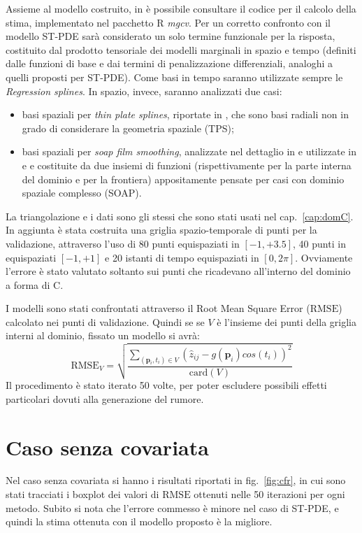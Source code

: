 \documentclass[a4paper,11pt,twoside,openright]{book}							%
\begin{document}
Assieme al modello costruito, in \cite{art:augustin} è possibile consultare il codice per il calcolo della stima, implementato nel pacchetto R \textit{mgcv}. Per un corretto confronto con il modello ST-PDE sarà considerato un solo termine funzionale per la risposta, costituito dal prodotto tensoriale dei modelli marginali in spazio e tempo (definiti dalle funzioni di base e dai termini di penalizzazione differenziali, analoghi a quelli proposti per ST-PDE). Come basi in tempo saranno utilizzate sempre le \textit{Regression splines}.
\newpage
In spazio, invece, saranno analizzati due casi:
\begin{itemize}
\item basi spaziali per \textit{thin plate splines}, riportate in \cite{package:mgcv4}, che sono basi radiali non in grado di considerare la geometria spaziale (TPS);
\item basi spaziali per \textit{soap film smoothing}, analizzate nel dettaglio in \cite{art:wood} e utilizzate in \cite{art:augustin} e \cite{art:marra} e costituite da due insiemi di funzioni (rispettivamente per la parte interna del dominio e per la frontiera) appositamente pensate per casi con dominio spaziale complesso (SOAP).
\end{itemize}

La triangolazione e i dati sono gli stessi che sono stati usati nel cap.~\ref{cap:domC}. In aggiunta è stata costruita una griglia spazio-temporale di punti per la validazione, attraverso l'uso di 80 punti equispaziati in $[-1,+3.5]$, 40 punti in equispaziati $[-1,+1]$ e 20 istanti di tempo equispaziati in $[0,2\pi]$. Ovviamente l'errore è stato valutato soltanto sui punti che ricadevano all'interno del dominio a forma di C.

I modelli sono stati confrontati attraverso il Root Mean Square Error ($\mathrm{RMSE}$) calcolato nei punti di validazione. Quindi se se $V$ è l'insieme dei punti della griglia interni al dominio, fissato un modello si avrà:
$$
\mathrm{RMSE}_V=\sqrt{\frac{\sum_{(\bm p_i,t_i)\in V} (\hat{z}_{ij}-g(\bm p_i)cos(t_i))^2}{\mathrm{card}(V)}}
$$ 
Il procedimento è stato iterato 50 volte, per poter escludere possibili effetti particolari dovuti alla generazione del rumore.

\newpage
\section{Caso senza covariata}
Nel caso senza covariata si hanno i risultati riportati in fig.~\ref{fig:cfr}, in cui sono stati tracciati i boxplot dei valori di $\mathrm{RMSE}$ ottenuti nelle 50 iterazioni per ogni metodo. Subito si nota che l'errore commesso è minore nel caso di ST-PDE, e quindi la stima ottenuta con il modello proposto è la migliore.
\end{document}
